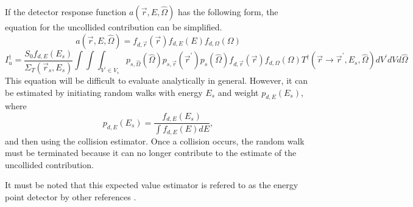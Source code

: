If the detector response function $a(\vec{r},E,\hat{\Omega})$ has the following
form, the equation for the uncollided contribution can be simplified.
\begin{equation*}
  a(\vec{r},E,\hat{\Omega}) = f_{d,\vec{r}}(\vec{r})f_{d,E}(E)f_{d,\Omega}(\Omega)
\end{equation*}
\begin{equation*}
  I_u^{\dagger}  = \frac{S_0f_{d,E}(E_s)}{\Sigma_T(\vec{r}_s,E_s)}
  \int\int\int_{V^{'} \in V_s} p_{s,\hat{\Omega}}(\hat{\Omega}) p_{s,\vec{r}}(\vec{r}^{'})
  p_s(\hat{\Omega})f_{d,\vec{r}}(\vec{r})f_{d,\Omega}(\Omega)
  T^{\dagger}(\vec{r} \to \vec{r}^{'},E_s,\hat{\Omega})
  dV^{'}dVd\hat{\Omega}
\end{equation*}
This equation will be difficult to evaluate analytically in general. However, 
it can be estimated by initiating random walks with energy $E_s$ and weight
$p_{d,E}(E_s)$, where
\begin{equation*}
  p_{d,E}(E_s) = \frac{f_{d,E}(E_s)}{\int f_{d,E}(E) dE},
\end{equation*}
and then using the collision estimator. Once a collision occurs, 
the random walk must be terminated because it can no longer contribute to the 
estimate of the uncollided contribution.

It must be noted that this expected value estimator is refered to as the 
energy point detector by other references \citep{gabler_amos_2006}.
